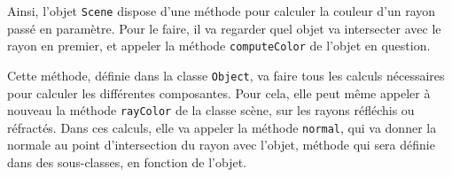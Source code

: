 \documentclass[a4paper]{article}
\begin{document}
    Ainsi, l'objet \verb+Scene+ dispose d'une méthode pour calculer la couleur
    d'un rayon passé en paramètre.
    Pour le faire, il va regarder quel objet va intersecter avec le rayon en
    premier, et appeler la méthode \verb+computeColor+ de l'objet en question.

    Cette méthode, définie dans la classe \verb+Object+, va faire tous les
    calculs nécessaires pour calculer les différentes composantes. Pour cela,
    elle peut même appeler à nouveau la méthode \verb+rayColor+ de la classe
    scène, sur les rayons réfléchis ou réfractés.
    Dans ces calculs, elle va appeler la méthode \verb+normal+, qui va donner
    la normale au point d'intersection du rayon avec l'objet, méthode qui sera
    définie dans des sous-classes, en fonction de l'objet.
\end{document}
